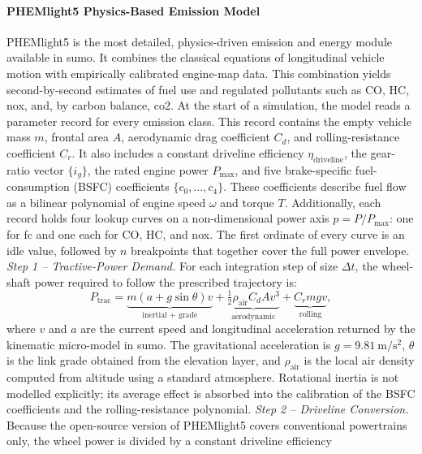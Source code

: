 \paragraph{PHEMlight5 Physics-Based Emission Model}  
PHEMlight5 is the most detailed, physics-driven emission and energy module available in \ac{sumo}. \cite{Krajzewicz2002} It combines the classical equations of longitudinal vehicle motion with empirically calibrated engine-map data. This combination yields second-by-second estimates of fuel use and regulated pollutants such as CO, HC, \ac{nox}, and, by carbon balance, \ac{co2}. At the start of a simulation, the model reads a parameter record for every emission class. This record contains the empty vehicle mass $m$, frontal area $A$, aerodynamic drag coefficient $C_{d}$, and rolling-resistance coefficient $C_{r}$. It also includes a constant driveline efficiency $\eta_{\mathrm{driveline}}$, the gear-ratio vector $\{i_{g}\}$, the rated engine power $P_{\max}$, and five brake-specific fuel-consumption (BSFC) coefficients $\{c_{0},\dots,c_{4}\}$. These coefficients describe fuel flow as a bilinear polynomial of engine speed $\omega$ and torque $T$. Additionally, each record holds four lookup curves on a non-dimensional power axis $p=P/P_{\max}$: one for \ac{fc} and one each for CO, HC, and \ac{nox}. The first ordinate of every curve is an idle value, followed by $n$ breakpoints that together cover the full power envelope.
\mynewline
\textit{Step 1 – Tractive-Power Demand.}  
For each integration step of size $\Delta t$, the wheel-shaft power required to follow the prescribed trajectory is:
\begin{equation}
    P_{\mathrm{trac}} = \underbrace{m\left(a+g\sin\theta\right)v}_{\text{inertial + grade}} + \underbrace{\tfrac{1}{2}\rho_{\mathrm{air}}C_{d}Av^{3}}_{\text{aerodynamic}} + \underbrace{C_{r}mgv}_{\text{rolling}},
\end{equation}
where $v$ and $a$ are the current speed and longitudinal acceleration returned by the kinematic micro-model in \ac{sumo}. The gravitational acceleration is $g=\SI{9.81}{\metre\per\second\squared}$, $\theta$ is the link grade obtained from the elevation layer, and $\rho_{\mathrm{air}}$ is the local air density computed from altitude using a standard atmosphere. Rotational inertia is not modelled explicitly; its average effect is absorbed into the calibration of the BSFC coefficients and the rolling-resistance polynomial.
\mynewline
\textit{Step 2 – Driveline Conversion.}  
Because the open-source version of PHEMlight5 covers conventional powertrains only, the wheel power is divided by a constant driveline efficiency
